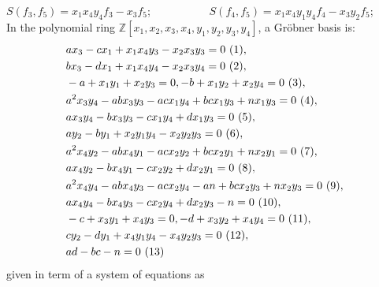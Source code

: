 \documentclass[sigconf,balance=false]{acmart}
\begin{document}
$S\displaystyle\left(f_{3}, f_{5}\right)=x_{1}x_{4}y_{4}f_{3}-x_{3}f_{5}$; \ \ \ \ \ \ \ \ \ \
$S\displaystyle\left(f_{4}, f_{5}\right)=x_{1}x_{4}y_{1}y_{4}f_{4}-x_{3}y_{2}f_{5}$;\\
In the polynomial ring $\mathbb{Z}\left[x_{1}, x_{2}, x_{3}, x_{4}, y_{1}, y_{2}, y_{3}, y_{4} \right]$, a Gröbner basis is:
\vspace{-0.3cm}
\begin{align*}
\displaystyle &ax_{3} - cx_{1} + x_{1}x_{4}y_{3} - x_{2}x_{3}y_{3}=0 \ (1),\\ 
&bx_{3} - dx_{1} + x_{1}x_{4}y_{4} - x_{2}x_{3}y_{4}=0 \ (2),\\ 
&-a + x_{1}y_{1} + x_{2}y_{3}=0, -b + x_{1}y_{2} + x_{2}y_{4}=0 \ (3),\\ 
&a^{2}x_{3}y_{4} - abx_{3}y_{3} - acx_{1}y_{4} + bcx_{1}y_{3} + nx_{1}y_{3}=0 \ (4),\\ 
&ax_{3}y_{4} - bx_{3}y_{3} - cx_{1}y_{4} + dx_{1}y_{3}=0 \ (5),\\ &ay_{2} - by_{1} + x_{2}y_{1}y_{4} - x_{2}y_{2}y_{3}=0 \ (6),\\
 &a^{2}x_{4}y_{2} - abx_{4}y_{1} - acx_{2}y_{2} + bcx_{2}y_{1} + nx_{2}y_{1}=0 \ (7),\\ 
&ax_{4}y_{2} - bx_{4}y_{1} - cx_{2}y_{2} + dx_{2}y_{1}=0 \ (8),\\ &a^{2}x_{4}y_{4} - abx_{4}y_{3} - acx_{2}y_{4} - an + bcx_{2}y_{3} + nx_{2}y_{3}=0 \ (9),\\ 
&ax_{4}y_{4} - bx_{4}y_{3} - cx_{2}y_{4} + dx_{2}y_{3} - n=0 \  (10),\\ 
&-c + x_{3}y_{1} + x_{4}y_{3}=0, -d + x_{3}y_{2} + x_{4}y_{4}=0 \ (11),\\ 
&cy_{2} - dy_{1} + x_{4}y_{1}y_{4} - x_{4}y_{2}y_{3}=0 \ (12),\\
 &ad - bc - n=0 \ (13)
\end{align*}
given in term of a system of equations as
\end{document}
